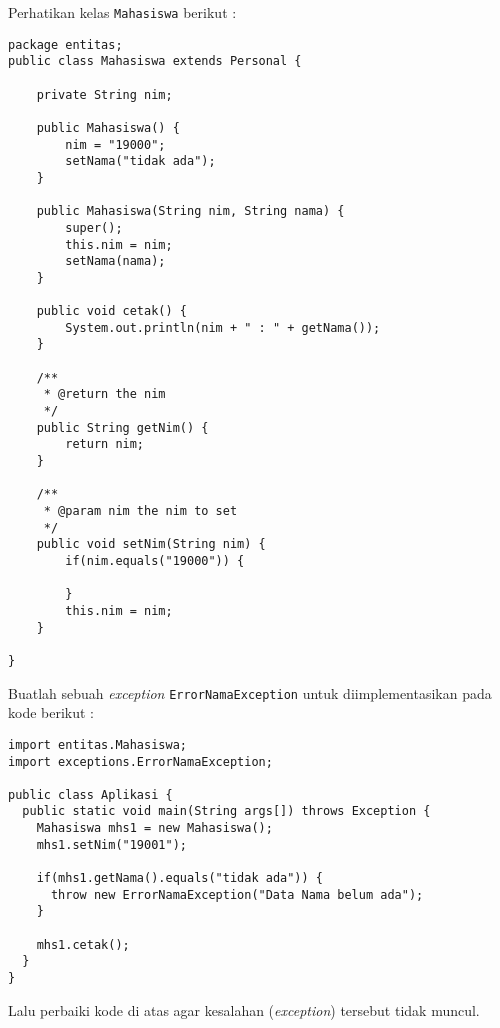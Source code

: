 Perhatikan kelas \texttt{Mahasiswa} berikut :

\begin{lstlisting}
package entitas;
public class Mahasiswa extends Personal {

    private String nim;

    public Mahasiswa() {
        nim = "19000";
        setNama("tidak ada");
    }

    public Mahasiswa(String nim, String nama) {
        super();
        this.nim = nim;
        setNama(nama);
    }

    public void cetak() {
        System.out.println(nim + " : " + getNama());
    }

    /**
     * @return the nim
     */
    public String getNim() {
        return nim;
    }

    /**
     * @param nim the nim to set
     */
    public void setNim(String nim) {
        if(nim.equals("19000")) {
            
        }
        this.nim = nim;
    }
    
}
\end{lstlisting}

Buatlah sebuah \textit{exception} \texttt{ErrorNamaException} untuk diimplementasikan pada kode berikut :

\begin{lstlisting}
import entitas.Mahasiswa;
import exceptions.ErrorNamaException;

public class Aplikasi {
  public static void main(String args[]) throws Exception {
    Mahasiswa mhs1 = new Mahasiswa();
    mhs1.setNim("19001");

    if(mhs1.getNama().equals("tidak ada")) {
      throw new ErrorNamaException("Data Nama belum ada");
    }

    mhs1.cetak();
  }
}
\end{lstlisting}

Lalu perbaiki kode di atas agar kesalahan (\textit{exception}) tersebut tidak muncul.